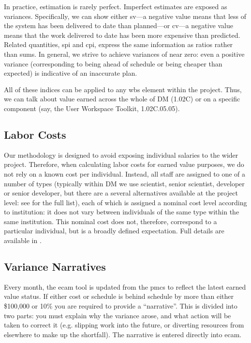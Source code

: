 In practice, estimation is rarely perfect.
Imperfect estimates are exposed as variances.
Specifically, we can show either \gls{sv}---a negative value means that less
of the system has been delivered to date than planned---or \gls{cv}---a negative value means that the work delivered to date has been more expensive than predicted.
Related quantities, \gls{spi} and \gls{cpi}, express the same information as ratios rather than sums.
In general, we strive to achieve variances of near zero: even a positive variance (corresponding to being ahead of schedule or being cheaper than expected) is indicative of an inaccurate plan.

All of these indices can be applied to any \gls{wbs} \gls{element} within the project.
Thus, we can talk about value earned across the whole of DM (1.02C) or on a specific component (say, the User Workspace Toolkit, 1.02C.05.05).

\subsection{Labor Costs}
\label{sec:labor-costs}

Our methodology is designed to avoid exposing individual salaries to the wider project.
Therefore, when calculating labor costs for earned value purposes, we do not rely on a known cost per individual.
Instead, all staff are assigned to one of a number of types (typically within DM we use scientist, senior scientist, developer or senior developer, but there are a several alternatives available at the project level: see  for the full list), each of which is assigned a nominal cost level according to institution: it does not vary between individuals of the same type within the same institution.
This nominal cost does not, therefore, correspond to a particular individual, but is a broadly defined expectation.
Full details are available in .

\subsection{Variance Narratives}
\label{sec:variance-narrative}

Every month, the \gls{ecam} tool is updated from the \gls{pmcs} to reflect the latest earned value status.
If either cost or schedule is behind schedule by more than either \$100,000 or 10\% you are required to provide a ``narrative''.
This is divided into two parts: you must explain why the variance arose, and what action will be taken to correct it (e.g.  slipping work into the future, or diverting resources from elsewhere to make up the shortfall).
The narrative is entered directly into \gls{ecam}.

